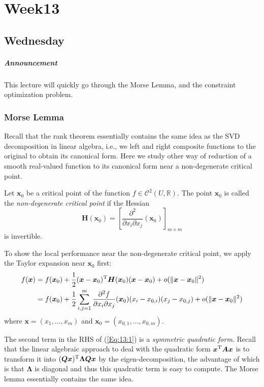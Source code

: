 
\chapter{Week13}
\section{Wednesday}
\paragraph{Announcement}
This lecture will quickly go through the Morse Lemma, and the constraint optimization problem.

\subsection{Morse Lemma}
Recall that the rank theorem essentially contains the same idea as the SVD decomposition in linear algebra, i.e., we left and right composite functions to the original to obtain its canonical form. Here we study other way of reduction of a smooth real-valued function to its canonical form near a non-degenerate critical point.
\begin{definition}
Let $\bm x_0$ be a critical point of the function $f\in\mathcal{C}^2(U,\mathbb{R}). $
The point $\bm x_0$ is called the \emph{non-degenerate critical point} if the Hessian 
\[
\bm H(\bm x_0)=
\left[
\frac{\partial^2}{\partial x_i\partial x_j}(\bm x_0)
\right]
_{m\times m}
\]
is invertible.
\end{definition}

To show the local performance near the non-degenerate critical point, we apply the Taylor expansion near $\bm x_0$ first:
\begin{equation}\label{Eq:13:1}
\begin{aligned}
f(\bm x)&=f(\bm x_0)+
\frac{1}{2}(\bm x-\bm x_0)\trans\bm H(\bm x_0)(\bm x-\bm x_0)+o(\|\bm x-\bm x_0\|^2)\\
&=f(\bm x_0)+\frac{1}{2}\sum_{i,j=1}^m\frac{\partial^2f}{\partial x_i\partial x_j}(\bm x_0)(x_i-x_{0,i})(x_j-x_{0,j})+o(\|\bm x-\bm x_0\|^2)
\end{aligned}
\end{equation}
where $\bm x = (x_1,\dots,x_m)$ and $\bm x_0=(x_{0,1},\dots,x_{0,m})$. 

The second term in the RHS of (\ref{Eq:13:1}) is a \emph{symmetric quadratic form}. Recall that the linear algebraic approach to deal with the quadratic form $\bm x^{\mathrm T}\bm A\bm x$ is to transform it into $(\bm Q\bm x)^{\mathrm T}\bm\Lambda\bm Q\bm x$ by the eigen-decomposition, the advantage of which is that $\bm\Lambda$ is diagonal and thus this quadratic term is easy to compute. The Morse lemma essentially contains the same idea.

